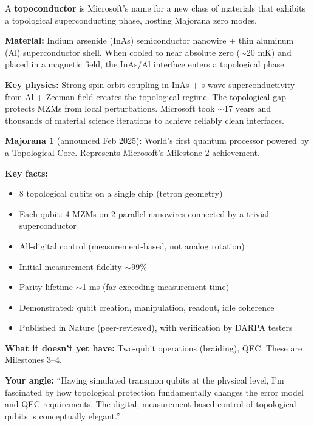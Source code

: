 \documentclass[11pt,a4paper]{article}
\begin{document}
\begin{answerbox}[A63. Topoconductor]
A \textbf{topoconductor} is Microsoft's name for a new class of materials that exhibits a topological superconducting phase, hosting Majorana zero modes.

\textbf{Material:} Indium arsenide (InAs) semiconductor nanowire + thin aluminum (Al) superconductor shell. When cooled to near absolute zero ($\sim$20 mK) and placed in a magnetic field, the InAs/Al interface enters a topological phase.

\textbf{Key physics:} Strong spin-orbit coupling in InAs + s-wave superconductivity from Al + Zeeman field creates the topological regime. The topological gap protects MZMs from local perturbations. Microsoft took $\sim$17 years and thousands of material science iterations to achieve reliably clean interfaces.
\end{answerbox}

\begin{answerbox}[A64. Majorana 1]
\textbf{Majorana 1} (announced Feb 2025): World's first quantum processor powered by a Topological Core. Represents Microsoft's Milestone 2 achievement.

\textbf{Key facts:}
\begin{itemize}
    \item 8 topological qubits on a single chip (tetron geometry)
    \item Each qubit: 4 MZMs on 2 parallel nanowires connected by a trivial superconductor
    \item All-digital control (measurement-based, not analog rotation)
    \item Initial measurement fidelity $\sim$99\%
    \item Parity lifetime $\sim$1 ms (far exceeding measurement time)
    \item Demonstrated: qubit creation, manipulation, readout, idle coherence
    \item Published in Nature (peer-reviewed), with verification by DARPA testers
\end{itemize}
\textbf{What it doesn't yet have:} Two-qubit operations (braiding), QEC. These are Milestones 3--4.

\textbf{Your angle:} ``Having simulated transmon qubits at the physical level, I'm fascinated by how topological protection fundamentally changes the error model and QEC requirements. The digital, measurement-based control of topological qubits is conceptually elegant.''
\end{answerbox}
\end{document}
